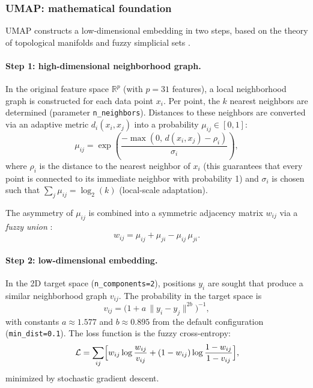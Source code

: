 \documentclass[11pt,a4paper,twoside]{article}
\theoremstyle{remark}
\begin{document}
\subsubsection*{UMAP: mathematical foundation}

UMAP constructs a low-dimensional embedding in two steps, based on
the theory of topological manifolds and fuzzy simplicial sets
\cite{McInnes2018}.

\paragraph{Step 1: high-dimensional neighborhood graph.}

In the original feature space $\mathbb{R}^p$ (with $p = 31$
features), a local neighborhood graph is constructed for each data
point $x_i$. Per point, the $k$ nearest neighbors are determined
(parameter \texttt{n\_neighbors}). Distances to these neighbors
are converted via an adaptive metric $d_i(x_i, x_j)$ into a
probability $\mu_{ij} \in [0,1]$:
\begin{equation}
  \mu_{ij} = \exp\!\left(\frac{-\max(0,\,
              d(x_i, x_j) - \rho_i)}{\sigma_i}\right),
  \label{eq:umap-mu}
\end{equation}
where $\rho_i$ is the distance to the nearest neighbor of $x_i$
(this guarantees that every point is connected to its immediate
neighbor with probability 1) and $\sigma_i$ is chosen such that
$\sum_j \mu_{ij} = \log_2(k)$ (local-scale adaptation).

The asymmetry of $\mu_{ij}$ is combined into a symmetric adjacency
matrix $w_{ij}$ via a \emph{fuzzy union} \cite{McInnes2018}:
\begin{equation}
  w_{ij} = \mu_{ij} + \mu_{ji} - \mu_{ij}\,\mu_{ji}.
  \label{eq:umap-w}
\end{equation}

\paragraph{Step 2: low-dimensional embedding.}

In the 2D target space (\texttt{n\_components=2}), positions $y_i$
are sought that produce a similar neighborhood graph $v_{ij}$.
The probability in the target space is
\begin{equation}
  v_{ij} = \bigl(1 + a\,\|y_i - y_j\|^{2b}\bigr)^{-1},
\end{equation}
with constants $a \approx 1.577$ and $b \approx 0.895$ from the
default configuration (\texttt{min\_dist=0.1}). The loss function
is the fuzzy cross-entropy:
\begin{equation}
  \mathcal{L} = \sum_{ij} \Bigl[w_{ij}\log\frac{w_{ij}}{v_{ij}}
              + (1 - w_{ij})\log\frac{1 - w_{ij}}{1 - v_{ij}}\Bigr],
  \label{eq:umap-loss}
\end{equation}
minimized by stochastic gradient descent.
\end{document}
